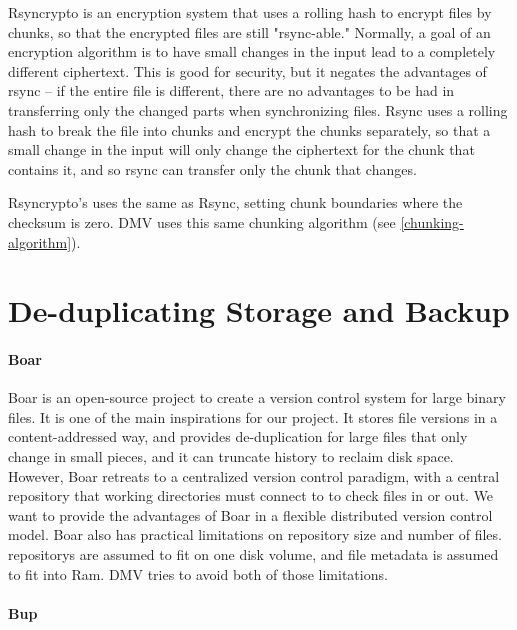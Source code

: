 Rsyncrypto\cite{rsyncrypto_algorithm} is an encryption system that uses a
rolling hash to encrypt files by chunks, so that the encrypted files are still
"rsync-able." Normally, a goal of an encryption algorithm is to have small
changes in the input lead to a completely different ciphertext. This is good for
security, but it negates the advantages of rsync -- if the entire file is
different, there are no advantages to be had in transferring only the changed
parts when synchronizing files. Rsync uses a rolling hash to break the file into
chunks and encrypt the chunks separately, so that a small change in the input
will only change the ciphertext for the chunk that contains it, and so rsync can
transfer only the chunk that changes.

Rsyncrypto's uses the same  as
Rsync\cite{rsyncrypto_algorithm,rsynctechreport}, setting chunk boundaries where
the checksum is zero. \gls{DMV} uses this same chunking algorithm (see
\autoref{chunking-algorithm}).


\section{De-duplicating Storage and Backup}

\paragraph{Boar}

Boar \cite{boar_homepage} is an open-source project to create a version control
system for large binary files. It is one of the main inspirations for our
project. It stores file versions in a content-addressed way, and provides
de-duplication for large files that only change in small pieces, and it can
truncate history to reclaim disk space. However, Boar retreats to a centralized
version control paradigm, with a central \gls{repository} that working
directories must connect to to check files in or out. We want to provide the
advantages of Boar in a flexible distributed version control model. Boar also
has practical limitations on \gls{repository} size and number of files.
\glspl{repository} are assumed to fit on one disk volume, and file metadata is
assumed to fit into Ram. \gls{DMV} tries to avoid both of those limitations.


\paragraph{Bup}\label{related_bup}

